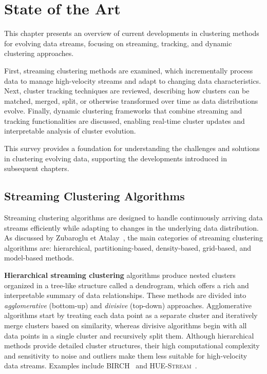 \chapter{State of the Art}\label{ch:state_of_the_art}

This chapter presents an overview of current developments in clustering methods
for evolving data streams, focusing on streaming, tracking, and dynamic
clustering approaches.

First, streaming clustering methods are examined, which incrementally process
data to manage high-velocity streams and adapt to changing data
characteristics. Next, cluster tracking techniques are reviewed, describing how
clusters can be matched, merged, split, or otherwise transformed over time as
data distributions evolve. Finally, dynamic clustering frameworks that combine
streaming and tracking functionalities are discussed, enabling real-time
cluster updates and interpretable analysis of cluster evolution.

This survey provides a foundation for understanding the challenges and
solutions in clustering evolving data, supporting the developments introduced
in subsequent chapters.

\section{Streaming Clustering Algorithms}\label{sec:streaming_clustering_algorithms}

Streaming clustering algorithms are designed to handle continuously arriving
data streams efficiently while adapting to changes in the underlying data
distribution. As discussed by Zubaroglu et
Atalay~\cite{streaming_clustering_review}, the main categories of streaming
clustering algorithms are: hierarchical, partitioning-based, density-based,
grid-based, and model-based methods.

\textbf{Hierarchical streaming clustering} algorithms produce nested clusters organized
in a tree-like structure called a dendrogram, which offers a rich and interpretable
summary of data relationships. These methods are divided into \emph{agglomerative} (bottom-up)
and \emph{divisive} (top-down) approaches. Agglomerative algorithms start by treating
each data point as a separate cluster and iteratively merge clusters based on similarity,
whereas divisive algorithms begin with all data points in a single cluster and recursively
split them. Although hierarchical methods provide detailed cluster structures, their high
computational complexity and sensitivity to noise and outliers make them less suitable for
high-velocity data streams. Examples include \textsc{BIRCH}~\cite{birch} and
\textsc{HUE-Stream}~\cite{hue_stream}.

